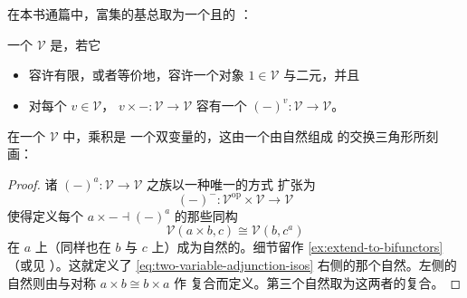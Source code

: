 
\providecommand{\Cat}{\mathcal{C}at}
\providecommand{\sSet}{s\mathcal{S}et}

\section{\trCartesianClosed{}\trCategory}\label{sec:cartesian-closed-categories}

在本书通篇中，富集的基\trCategory{}总取为一个\trComplete{}且\trCocomplete{}的%
\trCartesianClosed{}\trCategory：

\begin{definition}\label{def:cartesian-closed}
一个\trCategory{} $\mathcal{V}$ 是\trCartesianClosed，若它
\begin{itemize}
\item 容许有限\trProduct，或者等价地，容许一个\trTerminal{}对象
  $1\in\mathcal{V}$ 与二元\trProduct，并且
\item 对每个 $v\in\mathcal{V}$，\trFunctor{}
  $v\times-\colon\mathcal{V}\to\mathcal{V}$ 容有一个\trRightAdjoint{}
  $(-)^{v}\colon\mathcal{V}\to\mathcal{V}$。
\end{itemize}
\end{definition}

\begin{lemma}\label{lem:two-variable-adjunction}
在一个\trCartesianClosed{}\trCategory{} $\mathcal{V}$ 中，乘积\trBifunctor{}是
一个双变量\trAdjunction{}的\trLeftAdjoint，这由一个由自然\trIsomorphism{}组成
的交换三角形所刻画：
\begin{rveq}\label{eq:two-variable-adjunction-isos}
\end{rveq}
\end{lemma}

\begin{proof}
诸\trFunctor{} $(-)^{a}\colon\mathcal{V}\to\mathcal{V}$ 之族以一种唯一的方式
扩张为\trBifunctor
\[ (-)^{-}\colon\mathcal{V}^{\mathrm{op}}\times\mathcal{V}\to\mathcal{V} \]
使得定义每个\trAdjunction{} $a\times-\dashv(-)^{a}$ 的那些同构
\[ \mathcal{V}(a\times b,c)\cong\mathcal{V}(b,c^{a}) \]
在 $a$ 上（同样也在 $b$ 与 $c$ 上）成为自然的。细节留作%
\cref{ex:extend-to-bifunctors}（或见 \cite[4.3.6]{bib104}）。这就定义了
\eqref{eq:two-variable-adjunction-isos} 右侧的那个自然\trIsomorphism。左侧的
自然\trIsomorphism{}则由与对称\trIsomorphism{} $a\times b\cong b\times a$ 作
复合而定义。第三个自然\trIsomorphism{}取为这两者的复合。
\end{proof}

